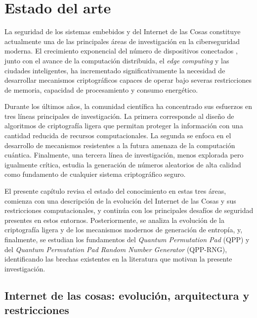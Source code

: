 
\chapter{Estado del arte}

La seguridad de los sistemas embebidos y del Internet de las Cosas constituye actualmente una de las principales áreas de investigación en la ciberseguridad moderna. El crecimiento exponencial del número de dispositivos conectados \cite{Sinha2025StateGlobally}, junto con el avance de la computación distribuida, el \textit{edge computing} y las ciudades inteligentes, ha incrementado significativamente la necesidad de desarrollar mecanismos criptográficos capaces de operar bajo severas restricciones de memoria, capacidad de procesamiento y consumo energético.

Durante los últimos años, la comunidad científica ha concentrado sus esfuerzos en tres líneas principales de investigación. La primera corresponde al diseño de algoritmos de criptografía ligera que permitan proteger la información con una cantidad reducida de recursos computacionales. La segunda se enfoca en el desarrollo de mecanismos resistentes a la futura amenaza de la computación cuántica. Finalmente, una tercera línea de investigación, menos explorada pero igualmente crítica, estudia la generación de números aleatorios de alta calidad como fundamento de cualquier sistema criptográfico seguro.

El presente capítulo revisa el estado del conocimiento en estas tres áreas, comienza con una descripción de la evolución del Internet de las Cosas y sus restricciones computacionales, y continúa con los principales desafíos de seguridad presentes en estos entornos. Posteriormente, se analiza la evolución de la criptografía ligera y de los mecanismos modernos de generación de entropía, y, finalmente, se estudian los fundamentos del \textit{Quantum Permutation Pad} (QPP) y del \textit{Quantum Permutation Pad Random Number Generator} (QPP-RNG), identificando las brechas existentes en la literatura que motivan la presente investigación.



\section{Internet de las cosas: evolución, arquitectura y restricciones}

